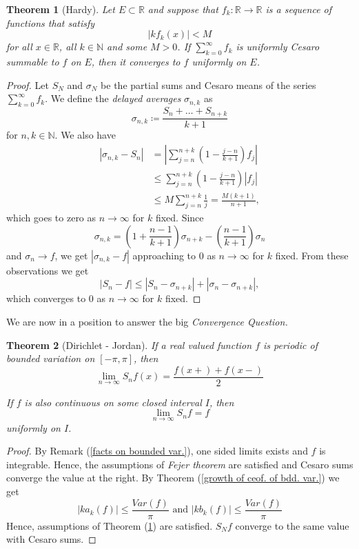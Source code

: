 \documentclass[12pt]{amsart}
\newtheorem{theorem}{Theorem}[section]
\theoremstyle{definition}
\newcommand{\NN}{{\mathbb N}} %
\newcommand{\RR}{{\mathbb R}} %
\begin{document}
\begin{theorem}[Hardy]\label{Hardy}
    Let $E \subset \RR$ and suppose that $f_k: \RR \to \RR$ is a sequence of functions that satisfy
    \[
    |kf_k(x)| < M
    \]
    for all $x \in \RR$, all $k \in \NN$ and some $M > 0$. If $\sum_{k=0}^{\infty}f_k$ is uniformly Cesaro summable to $f$ on $E$,
    then it converges to $f$ uniformly on $E$.
\end{theorem}


\begin{proof}

Let $S_N$ and $\sigma_N$ be the partial sums and Cesaro means of the series $\sum_{k=0}^{\infty}f_k$. We define the \emph{delayed averages} $\sigma_{n,k}$ as 
\[
\sigma_{n,k} \coloneqq \frac{S_{n} + \dots + S_{n+k}}{k+1}
\]
for $n,k \in \NN$. We also have
\[
\begin{aligned}
    |\sigma_{n,k} - S_n| 
    &= \left| \sum_{j=n}^{n+k}\left( 1 - \frac{j-n}{k+1}\right)f_j\right| \\
    &\leq \sum_{j=n}^{n+k}\left( 1 - \frac{j-n}{k+1}\right)|f_j| \\
    &\leq M \sum_{j=n}^{n+k}\frac{1}{j} = \frac{M(k+1)}{n+1},           
\end{aligned}
\]
which goes to zero as $n \to \infty$ for $k$ fixed. Since 
\[
\sigma_{n,k} = \left(1 + \frac{n-1}{k+1}\right)\sigma_{n+k} - \left(\frac{n-1}{k+1}\right)\sigma_{n}
\]
and $\sigma_n \to f$, we get $|\sigma_{n,k} - f|$ approaching to 0 as $n \to \infty$ for $k$ fixed. From these observations we get
\[
|S_n - f| \leq |S_n - \sigma_{n+k}| + |\sigma_n - \sigma_{n+k}|,
\]
which converges to 0 as $n \to \infty$ for $k$ fixed. \qedhere
\end{proof}


We are now in a position to answer the big \emph{Convergence Question.}

\begin{theorem}[Dirichlet - Jordan]\label{Dirichlet - Jordan}
    If a real valued function $f$ is periodic of bounded variation on $[-\pi,\pi]$, then
    \[
    \lim_{n \to \infty}S_nf(x) = \frac{f(x+) + f(x-)}{2}
    \]

    If $f$ is also continuous on some closed interval $I$, then
    \[
    \lim_{n \to \infty}S_nf = f
    \]
    uniformly on $I$.
\end{theorem}


\begin{proof}
    By Remark (\ref{facts on bounded var.}), one sided limits exists and $f$ is integrable. Hence, the assumptions of \emph{Fejer theorem} are satisfied and Cesaro sums converge the value at the right. By Theorem (\ref{growth of ceof. of bdd. var.}) we get
    \[
    |ka_k(f)|\leq \frac{Var(f)}{\pi}  \text{ and }  |kb_k(f)| \leq \frac{Var(f)}{\pi}
    \]
    Hence, assumptions of Theorem (\ref{Hardy}) are satisfied. $S_Nf$ converge to the same value with Cesaro sums.
\end{proof}
\end{document}
